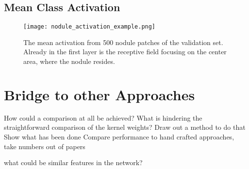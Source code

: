 \documentclass[main.tex]{subfiles}
\begin{document}
\subsection{Mean Class Activation}

\begin{figure}
\begin{center}
\texttt{[image: nodule\_activation\_example.png]}
\end{center}
\caption{The mean activation from 500 nodule patches of the validation set. Already in the first layer is the receptive field focusing on the center area, where the nodule resides.}
\label{fig:mean_activation}
\end{figure}


\section{Bridge to other Approaches}
How could a comparison at all be achieved? What is hindering the straightforward comparison of the kernel weights? Draw out a method to do that
Show what has been done
Compare performance to hand crafted approaches, 
take numbers out of papers

what could be similar features in the network?
\end{document}

